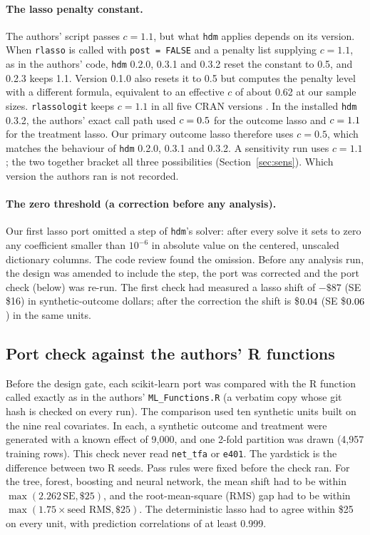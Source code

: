 \documentclass[11pt]{article}
\newcommand{\var}[1]{\texttt{#1}}
\begin{document}
\paragraph{The lasso penalty constant.} The authors' script passes $c = 1.1$, but what
\var{hdm} applies depends on its version. When \var{rlasso} is called with
\var{post = FALSE} and a penalty list supplying $c = 1.1$, as in the authors' code,
\var{hdm} 0.2.0, 0.3.1 and 0.3.2 reset the constant to 0.5, and 0.2.3 keeps 1.1. Version
0.1.0 also resets it to 0.5 but computes the penalty level with a different formula,
equivalent to an effective $c$ of about 0.62 at our sample sizes. \var{rlassologit} keeps
$c = 1.1$ in all five CRAN versions \citep{hdm_cran}. In the installed \var{hdm} 0.3.2,
the authors' exact call path used $c = 0.5$ for the outcome lasso and
$c = 1.1$ for the treatment lasso. Our primary outcome lasso therefore uses
$c = 0.5$, which matches the behaviour of \var{hdm} 0.2.0, 0.3.1 and 0.3.2. A
sensitivity run uses $c = 1.1$; the two together bracket all three possibilities
(Section~\ref{sec:sens}). Which version the authors ran is not recorded.

\paragraph{The zero threshold (a correction before any analysis).} Our first lasso port
omitted a step of \var{hdm}'s solver: after every solve it sets to zero any coefficient
smaller than $10^{-6}$ in absolute value on the centered, unscaled dictionary columns.
The code review found the omission. Before any analysis run, the design was amended to
include the step, the port was corrected and the port check (below) was re-run. The
first check had measured a lasso shift of $-\$87$ (SE \$16) in synthetic-outcome
dollars; after the correction the shift is \$$0.04$ (SE
\$$0.06$) in the same units.

\subsection{Port check against the authors' R functions}
\label{sec:portcheck}

Before the design gate, each scikit-learn port was compared with the R function called
exactly as in the authors' \var{ML\_Functions.R} (a verbatim copy whose git hash is
checked on every run). The comparison used ten synthetic units built on the nine real
covariates. In each, a synthetic outcome and treatment were generated with a known effect
of 9,000, and one 2-fold partition was drawn (4,957 training rows). This check never
read \var{net\_tfa} or \var{e401}. The yardstick is the difference between two R
seeds. Pass rules were fixed before the check ran. For the tree, forest, boosting and
neural network, the mean shift had to be within $\max(2.262\,\text{SE}, \$25)$, and the
root-mean-square (RMS) gap had to be within $\max(1.75 \times \text{seed RMS}, \$25)$.
The deterministic lasso had to agree within \$25 on every unit, with prediction
correlations of at least 0.999.
\end{document}
